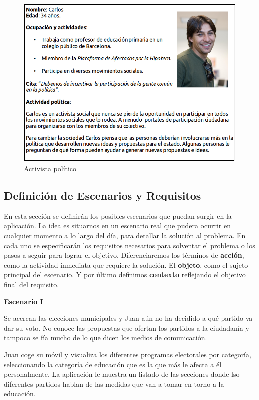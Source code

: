 	\begin{figure}[H]
      \centering
	\includegraphics[keepaspectratio, scale=0.5]{Media/Captures/person2.png}
      \caption{Activista político}
      \label{fig:activistPerson}
    \end{figure}


\subsection{Definición de Escenarios y Requisitos}\label{ssec:requisites}

En esta sección se definirán los posibles escenarios que puedan surgir en la aplicación. La idea es situarnos en un escenario real que pudera ocurrir en cualquier momento a lo largo del día, para detallar la solución al problema. En cada uno se especificarán los requisitos necesarios para solventar el problema o los pasos a seguir para lograr el objetivo. Diferenciaremos los términos de \textbf{acción}, como la actividad inmediata que requiere la solución. El \textbf{objeto}, como el sujeto principal del escenario. Y por último definimos \textbf{contexto} reflejando el objetivo final del requisito.

\textbf{Escenario I}

Se acercan las elecciones municipales y Juan aún no ha decidido a qué partido va dar su voto. No conoce las propuestas que ofertan los partidos a la ciudadanía y tampoco se fía mucho de lo que dicen los medios de comunicación.

Juan coge su móvil y visualiza los diferentes programas electorales por categoría, seleccionando la categoría de educación que es la que más le afecta a él personalmente. La aplicación le muestra un listado de las secciones donde lso diferentes partidos hablan de las medidas que van a tomar en torno a la educación.


